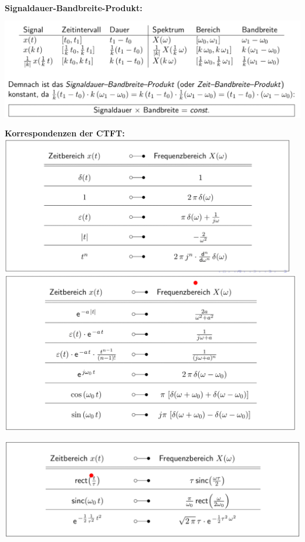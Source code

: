 \documentclass[12pt,a4paper]{scrartcl}
\begin{document}
  \noindent \textbf{Signaldauer-Bandbreite-Produkt:}\\
  \includegraphics[height=5cm]{Pictures/SignalBand.png} \\

  \noindent \textbf{Korrespondenzen der CTFT:} \\
  \includegraphics[height = 6cm]{Pictures/Korrespondenz.png}\\
  \includegraphics[height = 7cm]{Pictures/Korrespondenz2.png}\\
  \includegraphics[height = 5cm]{Pictures/Korrespondenz3.png}
\end{document}

